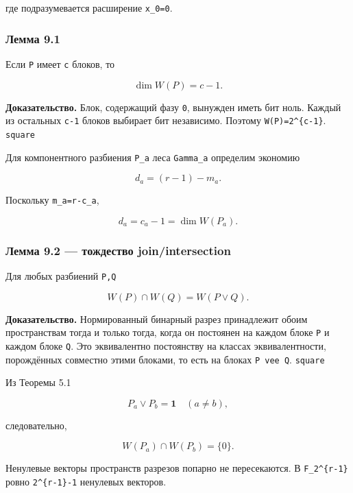 где подразумевается расширение \texttt{x\_0=0}.

\hypertarget{ux43bux435ux43cux43cux430-9.1}{%
\subsubsection{Лемма 9.1}\label{ux43bux435ux43cux43cux430-9.1}}

Если \texttt{P} имеет \texttt{c} блоков, то

\[
\dim W(P)=c-1.
\tag{41}
\]

\textbf{Доказательство.} Блок, содержащий фазу \texttt{0}, вынужден
иметь бит ноль. Каждый из остальных \texttt{c-1} блоков выбирает бит
независимо. Поэтому \texttt{\textbar{}W(P)\textbar{}=2\^{}\{c-1\}}.
\texttt{square}

Для компонентного разбиения \texttt{P\_a} леса \texttt{Gamma\_a}
определим экономию

\[
d_a=(r-1)-m_a.
\tag{42}
\]

Поскольку \texttt{m\_a=r-c\_a},

\[
d_a=c_a-1=\dim W(P_a).
\tag{43}
\]

\hypertarget{ux43bux435ux43cux43cux430-9.2-ux442ux43eux436ux434ux435ux441ux442ux432ux43e-joinintersection}{%
\subsubsection{Лемма 9.2 --- тождество
join/intersection}\label{ux43bux435ux43cux43cux430-9.2-ux442ux43eux436ux434ux435ux441ux442ux432ux43e-joinintersection}}

Для любых разбиений \texttt{P,Q}

\[
\boxed{W(P)\cap W(Q)=W(P\vee Q).}
\tag{44}
\]

\textbf{Доказательство.} Нормированный бинарный разрез принадлежит обоим
пространствам тогда и только тогда, когда он постоянен на каждом блоке
\texttt{P} и каждом блоке \texttt{Q}. Это эквивалентно постоянству на
классах эквивалентности, порождённых совместно этими блоками, то есть на
блоках \texttt{P\ vee\ Q}. \texttt{square}

Из Теоремы 5.1

\[
P_a\vee P_b=\mathbf 1
\quad(a\ne b),
\]

следовательно,

\[
W(P_a)\cap W(P_b)=\{0\}.
\tag{45}
\]

Ненулевые векторы пространств разрезов попарно не пересекаются. В
\texttt{F\_2\^{}\{r-1\}} ровно \texttt{2\^{}\{r-1\}-1} ненулевых
векторов.

